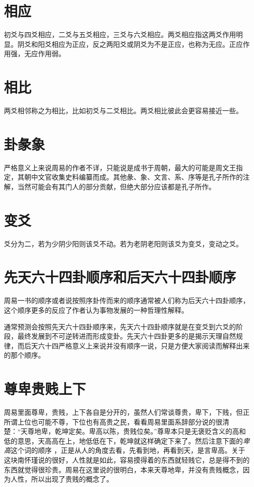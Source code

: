 \documentclass[12pt,oneside]{book}
\begin{document}
\section{相应}
初爻与四爻相应，二爻与五爻相应，三爻与六爻相应。两爻相应指这两爻作用明显。阴爻和阳爻相应为正应，反之两阳爻或阴爻为不是正应，也称为无应。正应作用强，无应作用弱。

\section{相比}
两爻相邻称之为相比，比如初爻与二爻相比。两爻相比彼此会更容易接近一些。

\section{卦彖象}
严格意义上来说周易的作者不详，只能说是成书于周朝，最大的可能是周文王指定，其朝中文官收集史料编纂而成。其他彖、象、文言、系、序等是孔子所作的注解，当然可能会有其门人的部分贡献，但绝大部分应该都是孔子所作。

\section{变爻}
爻分为二，若为少阴少阳则该爻不动。若为老阴老阳则该爻为变爻，变动之爻。

\section{先天六十四卦顺序和后天六十四卦顺序}
周易一书的顺序或者说按照序卦传而来的顺序通常被人们称为后天六十四卦顺序，这个顺序更多的反应了作者认为事物发展的一种哲理性解释。

通常预测会按照先天六十四卦顺序来，先天六十四卦顺序就是在变爻到六爻的阶段，最终发展到不可逆转进而形成变卦。先天六十四卦更多的是揭示天理自然规律，而后天六十四严格意义上来说并没有顺序一说，只是方便大家阅读而解释出来的那个顺序。

\section{尊卑贵贱上下}
周易里面尊卑，贵贱，上下各自是分开的，虽然人们常谈尊贵，卑下，下贱，但正所谓上位也可能不尊，下位也有高贵之民，看看周易里面系辞部分说的很清楚：“天尊地卑，乾坤定矣。卑高以陈，贵贱位矣。”尊卑本只是无褒贬含义的高和低的意思，天高高在上，地低低在下，乾坤就这样确定下来了。然后注意下面的\emph{卑高}这个词的顺序 ，正是从人的角度去看，先看到地，再看到天，是言卑高。关于这块南怀瑾说的很好，人性就是如此，容易摸得着的东西就轻贱它，总是得不到的东西就觉得很珍贵。周易在这里说的很明白，本来天尊地卑，并没有贵贱概念，因为人性，所以出现了贵贱的概念了。
\end{document}
